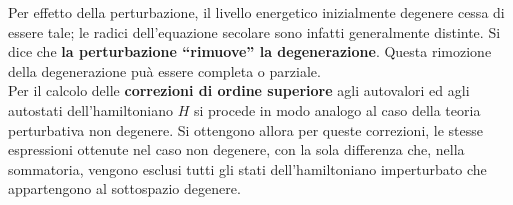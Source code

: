 \documentclass[a4paper,12pt,oneside]{book}
\begin{document}
Per effetto della perturbazione, il livello energetico inizialmente degenere cessa di essere tale; le radici dell'equazione secolare sono infatti generalmente distinte. Si dice che \textbf{la perturbazione ``rimuove'' la degenerazione}. Questa rimozione della degenerazione puà essere completa o parziale.\\

Per il calcolo delle \textbf{correzioni di ordine superiore} agli autovalori ed agli autostati dell'hamiltoniano $H$ si procede in modo analogo al caso della teoria perturbativa non degenere. Si ottengono allora per queste correzioni, le stesse espressioni ottenute nel caso non degenere, con la sola differenza che, nella sommatoria, vengono esclusi tutti gli stati dell'hamiltoniano imperturbato che appartengono al sottospazio degenere.
\end{document}
